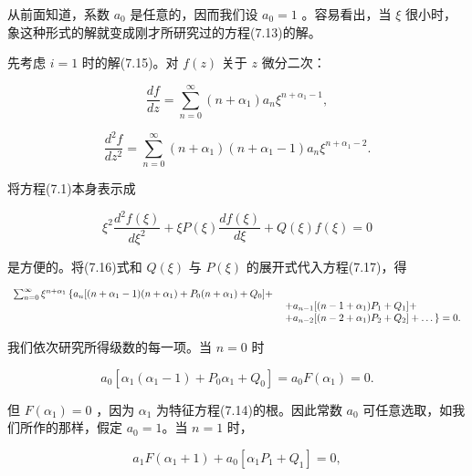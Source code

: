 从前面知道，系数 $a_0$ 是任意的，因而我们设 $a_0 = 1$ 。容易看出，当 $\xi$ 很小时，象这种形式的解就变成刚才所研究过的方程(7.13)的解。

先考虑 $i = 1$ 时的解(7.15)。对 $f(z)$ 关于 $z$ 微分二次：

\begin{equation*}
\frac {d f}{d z} = \sum_ {n = 0} ^ {\infty} (n + \alpha_ {1}) a _ {n} \xi^ {n + \alpha_ {1} - 1},\tag{7.16}
\end{equation*}

\begin{equation*}
\frac {d ^ {2} f}{d z ^ {2}} = \sum_ {n = 0} ^ {\infty} (n + \alpha_ {1}) (n + \alpha_ {1} - 1) a _ {n} \xi^ {n + \alpha_ {1} - 2}.
\end{equation*}

将方程(7.1)本身表示成

\begin{equation*}
\xi^ {2} \frac {d ^ {2} f (\xi)}{d \xi^ {2}} + \xi P (\xi) \frac {d f (\xi)}{d \xi} + Q (\xi) f (\xi) = 0\tag{7.17}
\end{equation*}

是方便的。将(7.16)式和 $Q(\xi)$ 与 $P(\xi)$ 的展开式代入方程(7.17)，得

\begin{equation*}
\begin{array}{r l} \sum_ {n = 0} ^ {\infty} \xi^ {n + \alpha_ {1}} \left\{a _ {n} [ (n + \alpha_ {1} - 1) (n + \alpha_ {1}) + P _ {0} (n + \alpha_ {1}) + Q _ {0} ] + \right. \\ & \left. + a _ {n - 1} [ (n - 1 + \alpha_ {1}) P _ {1} + Q _ {1} ] + \right. \\ & \left. + a _ {n - 2} [ (n - 2 + \alpha_ {1}) P _ {2} + Q _ {2} ] + \dots \right\} = 0. \end{array}
\end{equation*}

我们依次研究所得级数的每一项。当 $n = 0$ 时

\begin{equation*}
a _ {0} \left[ \alpha_ {1} \left(\alpha_ {1} - 1\right) + P _ {0} \alpha_ {1} + Q _ {0} \right] = a _ {0} F \left(\alpha_ {1}\right) = 0.
\end{equation*}

但 $F(\alpha_{1}) = 0$ ，因为 $\alpha_{1}$ 为特征方程(7.14)的根。因此常数 $a_0$ 可任意选取，如我们所作的那样，假定 $a_0 = 1$。当 $n = 1$ 时，

\begin{equation*}
a _ {1} F \left(\alpha_ {1} + 1\right) + a _ {0} \left[ \alpha_ {1} P _ {1} + Q _ {1} \right] = 0,
\end{equation*}

